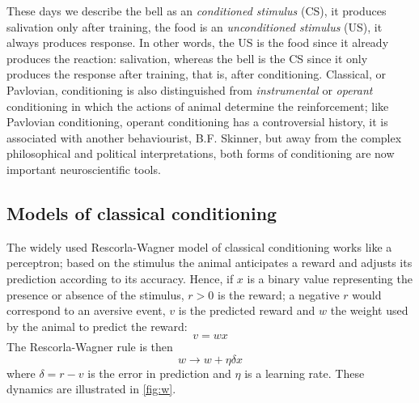 \documentclass[11pt,a4paper]{scrartcl}
\begin{document}
These days we describe the bell as an \textsl{conditioned stimulus}
(CS), it produces salivation only after training, the food is an
\textsl{unconditioned stimulus} (US), it always produces response. In
other words, the US is the food since it already produces the
reaction: salivation, whereas the bell is the CS since it only
produces the response after training, that is, after
conditioning. Classical, or Pavlovian, conditioning is also
distinguished from \textsl{instrumental} or \textsl{operant}
conditioning in which the actions of animal determine the
reinforcement; like Pavlovian conditioning, operant conditioning has a
controversial history, it is associated with another behaviourist,
B.F. Skinner, but away from the complex philosophical and political
interpretations, both forms of conditioning are now important
neuroscientific tools.

\subsection*{Models of classical conditioning}

The widely used Rescorla-Wagner model of classical conditioning works
\cite{RescorlaWagner1972a} like a perceptron; based on the stimulus
the animal anticipates a reward and adjusts its prediction according
to its accuracy. Hence, if $x$ is a binary value representing the
presence or absence of the stimulus, $r>0$ is the reward; a negative
$r$ would correspond to an aversive event, $v$ is the predicted reward and $w$ the weight used by the animal to predict the reward:
\begin{equation}
v=wx
\end{equation}
The Rescorla-Wagner rule is then
\begin{equation}
w\rightarrow w+\eta \delta x
\end{equation}
where $\delta =r-v$ is the error in prediction and $\eta$ is a
learning rate. These dynamics are illustrated in \ref{fig:w}.
\end{document}
